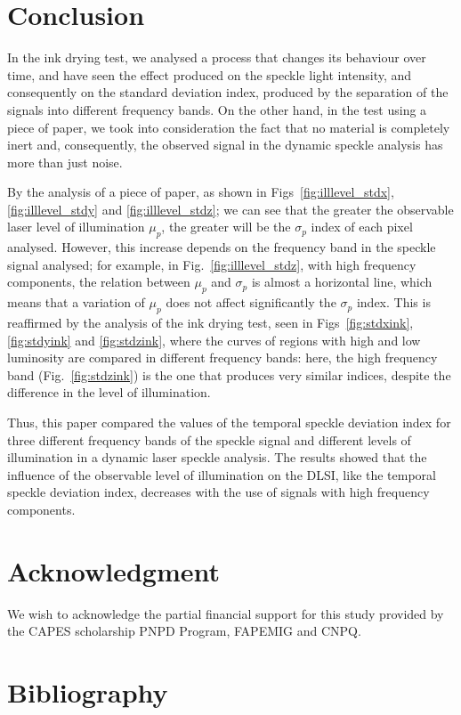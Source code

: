 \documentclass[review]{elsarticle}
\begin{document}
\section{Conclusion} 

In the ink drying test, 
we analysed a process that changes its behaviour over time,
and have seen the effect produced on  the speckle light intensity, 
and consequently on the standard deviation index, 
produced by the separation of the signals into different frequency bands.
On the other hand, in the test using a piece of paper, 
we took into consideration the fact that no material is completely inert and, consequently, 
the observed signal  in the  dynamic speckle analysis has more than just noise.

By the analysis of a piece of paper, as shown in Figs~\ref{fig:illlevel_stdx}, \ref{fig:illlevel_stdy} and \ref{fig:illlevel_stdz};
we can see that the greater the observable laser level of illumination $\mu_p$, 
the greater will be the $\sigma_p$ index of each pixel analysed. 
However, this increase depends on the frequency band in the speckle signal  analysed;
for example, in Fig.~\ref{fig:illlevel_stdz},
with high frequency components, the relation between $\mu_p$ and $\sigma_p$ is almost a horizontal line, 
which means that a variation of $\mu_p$ does not affect significantly the $\sigma_p$ index.
This is reaffirmed by the analysis of the ink drying test, 
seen in Figs~\ref{fig:stdxink}, \ref{fig:stdyink} and \ref{fig:stdzink},
where the curves of regions with high and low luminosity are compared in different frequency bands:
here, the high frequency band  (Fig.~\ref{fig:stdzink}) 
is the one that produces very similar indices, despite the difference in the level of illumination.

Thus, this paper compared the values of the temporal 
speckle deviation index for three different frequency bands of the speckle signal and 
different levels of illumination in a dynamic laser speckle analysis.
The results showed that the influence of the observable level of illumination on the DLSI, 
like the temporal speckle deviation index, 
decreases with the use of signals with high frequency components.

\section{Acknowledgment}
We wish to acknowledge the partial financial support for this study provided by the CAPES
scholarship
PNPD Program, FAPEMIG and CNPQ.

\section{Bibliography}


\end{document}
